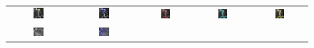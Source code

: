 \begin{figure}[t]
\begin{tabular}{@{}ccccc@{}}
\\
\includegraphics[width=0.19\textwidth]{images/L2S_compare_region/Vessel_CTA1_orig}&
\includegraphics[width=0.19\textwidth]{images/L2S_compare_region/Vessel_CTA1_CV}	&
\includegraphics[width=0.19\textwidth]{images/L2S_compare_region/Vessel_CTA1_Langton} &
\includegraphics[width=0.19\textwidth]{images/L2S_compare_region/Vessel_CTA1_Li}	&
\includegraphics[width=0.19\textwidth]{images/L2S_compare_region/Vessel_CTA1_ours}	
\\
\includegraphics[width=0.19\textwidth]{images/L2S_compare_region/vessel1_orig}	&
\includegraphics[width=0.19\textwidth]{images/L2S_compare_region/vessel1_CV}	&

\end{tabular}
\end{figure}
